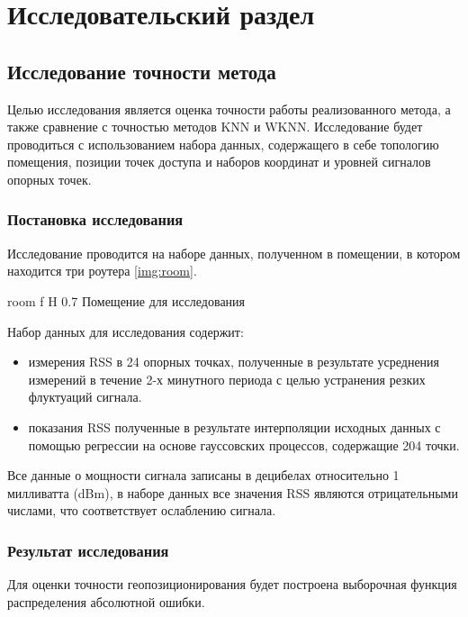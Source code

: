 \chapter{Исследовательский раздел}

\section{Исследование точности метода}

Целью исследования является оценка точности работы реализованного метода, а также сравнение с точностью методов KNN и WKNN. Исследование будет проводиться с использованием набора данных, содержащего в себе топологию помещения, позиции точек доступа и наборов координат и уровней сигналов опорных точек. 

\subsection{Постановка исследования}

Исследование проводится на наборе данных, полученном в помещении, в котором находится три роутера \ref{img:room}.

    {room}
    {f}
    {H}
    {0.7\linewidth}
    {Помещение для исследования}

Набор данных для исследования содержит:
\begin{itemize}[label=---]
    \item измерения RSS в 24 опорных точках, полученные в результате усреднения измерений в течение 2-х минутного периода с целью устранения резких флуктуаций сигнала.
    \item показания RSS полученные в результате интерполяции исходных данных с помощью регрессии на основе гауссовских процессов, содержащие 204 точки.
\end{itemize}

Все данные о мощности сигнала записаны в децибелах относительно 1 милливатта (dBm), в наборе данных все значения RSS являются отрицательными числами, что соответствует ослаблению сигнала.

\subsection{Результат исследования}

Для оценки точности геопозиционирования будет построена выборочная функция распределения абсолютной ошибки.

